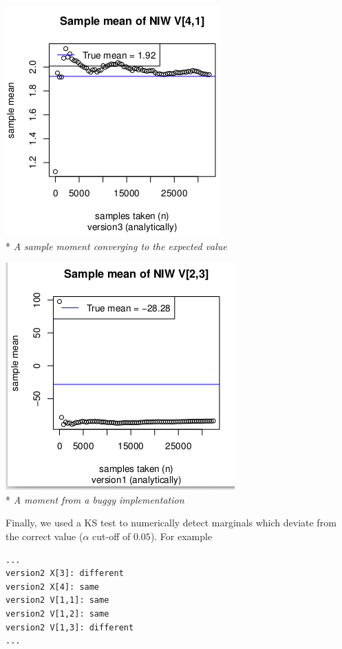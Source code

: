 \documentclass[english]{report}
\begin{document}
\begin{center}
\includegraphics[scale=.8]{momentcorrect.png}\\*
\emph{A sample moment converging to the expected value}
\end{center}

\begin{center}
\includegraphics[scale=.8]{momentincorrect.png}\\*
\emph{A moment from a buggy implementation}
\\  
\end{center}



Finally, we used a KS test to numerically detect marginals which deviate from the correct value ($\alpha$ cut-off of $0.05$). For example 
\begin{verbatim}
...
version2 X[3]: different
version2 X[4]: same
version2 V[1,1]: same
version2 V[1,2]: same
version2 V[1,3]: different
...
\end{verbatim}
\end{document}
